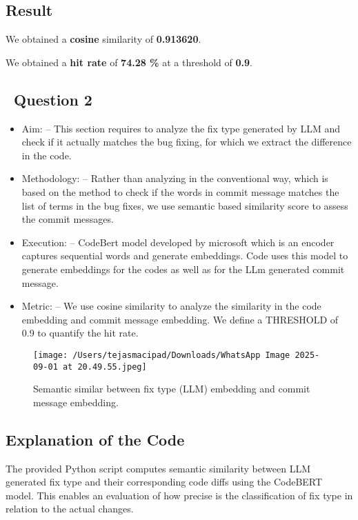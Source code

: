 \documentclass[12pt,a4paper]{article}
\begin{document}
\subsection*{Result}

We obtained a \textbf{cosine} similarity of \textbf{0.913620}.

We obtained a \textbf{hit rate} of \textbf{74.28 \%} at a threshold of \textbf{0.9}.


\newpage

\subsection*{\   Question 2}

\begin{itemize}
    \item {Aim:} -- This section requires to analyze the fix type generated by LLM and check if it actually matches the bug fixing, for which we extract the difference in the code.
    \item {Methodology:} -- Rather than analyzing in the conventional way, which is based on the method to check if the words in commit message matches the list of terms in the bug fixes, we use semantic based similarity score to assess the commit messages.
    \item {Execution:} -- CodeBert model developed by microsoft which is an encoder captures sequential words and generate embeddings. Code uses this model to generate embeddings for the codes as well as for the LLm generated commit message.
    \item {Metric: } -- We use cosine similarity to analyze the similarity in the code embedding and commit message embedding. We define a THRESHOLD of 0.9 to quantify the hit rate. 
\end{itemize}

\begin{figure}[h!]
    \centering
    \texttt{[image: /Users/tejasmacipad/Downloads/WhatsApp Image 2025-09-01 at 20.49.55.jpeg]}
    \caption{Semantic similar between fix type (LLM) embedding and commit message embedding.}
\end{figure}


\subsection*{Explanation of the Code}

The provided Python script computes semantic similarity between LLM generated fix type and their corresponding code diffs using the CodeBERT model. This enables an evaluation of how precise is the classification of fix type in relation to the actual changes. 
\end{document}
